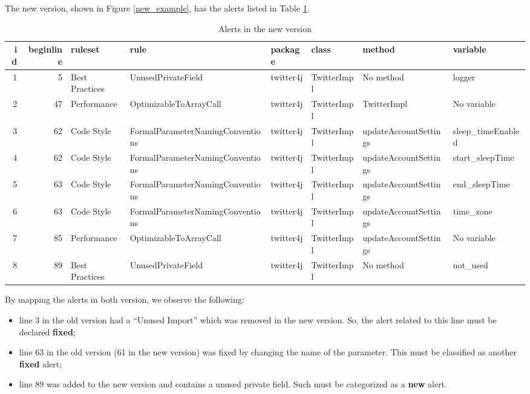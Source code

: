 \documentclass[
]{article}
\begin{document}
\normalsize

The new version, shown in Figure \ref{new_example}, has the alerts
listed in Table \ref{alerts_new}.

\small

\begin{table}[!h]

\caption{\label{tab:show alerts new}Alerts in the new version\label{alerts_new}}
\centering
\fontsize{6}{8}\selectfont
\begin{tabular}[t]{r|r|l|l|l|l|l|l}
\hline
id & beginline & ruleset & rule & package & class & method & variable\\
\hline
1 & 5 & Best Practices & UnusedPrivateField & twitter4j & TwitterImpl & No method & logger\\
\hline
2 & 47 & Performance & OptimizableToArrayCall & twitter4j & TwitterImpl & TwitterImpl & No variable\\
\hline
3 & 62 & Code Style & FormalParameterNamingConventions & twitter4j & TwitterImpl & updateAccountSettings & sleep\_timeEnabled\\
\hline
4 & 62 & Code Style & FormalParameterNamingConventions & twitter4j & TwitterImpl & updateAccountSettings & start\_sleepTime\\
\hline
5 & 63 & Code Style & FormalParameterNamingConventions & twitter4j & TwitterImpl & updateAccountSettings & end\_sleepTime\\
\hline
6 & 63 & Code Style & FormalParameterNamingConventions & twitter4j & TwitterImpl & updateAccountSettings & time\_zone\\
\hline
7 & 85 & Performance & OptimizableToArrayCall & twitter4j & TwitterImpl & updateAccountSettings & No variable\\
\hline
8 & 89 & Best Practices & UnusedPrivateField & twitter4j & TwitterImpl & No method & not\_used\\
\hline
\end{tabular}
\end{table}

\normalsize

By mapping the alerts in both version, we observe the following:

\begin{itemize}
\item
  line 3 in the old version had a ``Unused Import'' which was removed in
  the new version. So, the alert related to this line must be declared
  \textbf{fixed};
\item
  line 63 in the old version (61 in the new version) was fixed by
  changing the name of the parameter. This must be classified as another
  \textbf{fixed} alert;
\item
  line 89 was added to the new version and contains a unused private
  field. Such must be categorized as a \textbf{new} alert.
\end{itemize}
\end{document}

